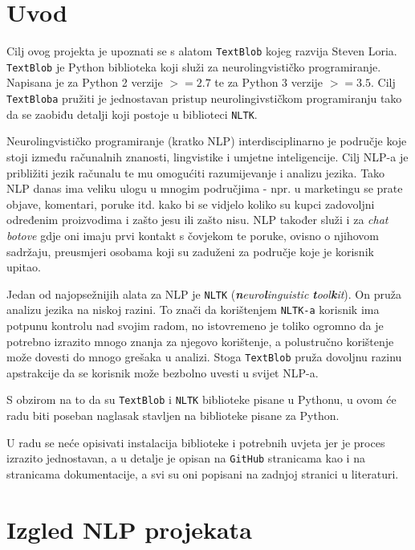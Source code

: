 \documentclass[10pt]{foi}
\begin{document}
\chapter{Uvod}


Cilj ovog projekta je upoznati se s alatom \texttt{TextBlob} kojeg razvija
Steven Loria. \texttt{TextBlob} je Python biblioteka koji služi za
neurolingvističko programiranje. Napisana je za Python 2 verzije $>=2.7$ te za
Python 3 verzije $>=3.5$. Cilj \texttt{TextBloba} pružiti je jednostavan
pristup neurolingivstičkom programiranju tako da se zaobiđu detalji koji
postoje u biblioteci \texttt{NLTK}.

Neurolingvističko programiranje (kratko NLP) interdisciplinarno je područje
koje stoji između računalnih znanosti, lingvistike i umjetne inteligencije.
Cilj NLP-a je približiti jezik računalu te mu omogućiti razumijevanje i analizu
jezika. Tako NLP danas ima veliku ulogu u mnogim područjima - npr. u marketingu
se prate objave, komentari, poruke itd. kako bi se vidjelo koliko su kupci
zadovoljni određenim proizvodima i zašto jesu ili zašto nisu. NLP također
služi i za \textit{chat botove} gdje oni imaju prvi kontakt s čovjekom te
poruke, ovisno o njihovom sadržaju, preusmjeri osobama koji su zaduženi za
područje koje je korisnik upitao.

Jedan od najopsežnijih alata za NLP je \texttt{NLTK}
(\textit{\textbf{n}euro\textbf{l}inguistic \textbf{t}ool\textbf{k}it}). On
pruža analizu jezika na niskoj razini. To znači da korištenjem \texttt{NLTK-a}
korisnik ima potpunu kontrolu nad svojim radom, no istovremeno je toliko
ogromno da je potrebno izrazito mnogo znanja za njegovo korištenje, a
polustručno korištenje može dovesti do mnogo grešaka u analizi. Stoga
\texttt{TextBlob} pruža dovoljnu razinu apstrakcije da se korisnik može
bezbolno uvesti u svijet NLP-a.

S obzirom na to da su \texttt{TextBlob} i \texttt{NLTK} biblioteke pisane u
Pythonu, u ovom će radu biti poseban naglasak stavljen na biblioteke pisane za
Python.

U radu se neće opisivati instalacija biblioteke i potrebnih uvjeta jer je
proces izrazito jednostavan, a u detalje je opisan na \texttt{GitHub}
stranicama kao i na stranicama dokumentacije, a svi su oni popisani na zadnjoj
stranici u literaturi.


\chapter{Izgled NLP projekata}
\end{document}
